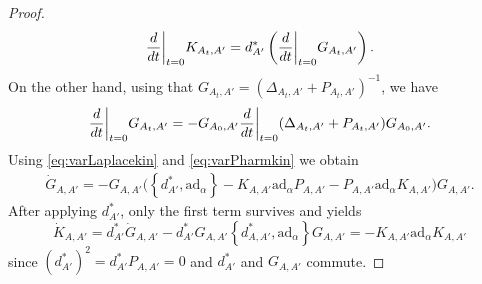 \documentclass[11pt,a4paper]{amsart}
\theoremstyle{plain} %
\theoremstyle{definition}
\theoremstyle{remark}
\newcommand{\dd}{d}
\newcommand\restr[2]{{%
  \left.\kern-\nulldelimiterspace %
  #1 %
  \vphantom{\big|} %
  \right|_{#2} %
  }}
\begin{document}
\begin{proof}
$$\restr{\frac{d}{dt}}{t=0}{K}_{A_t,A'} =  \dd^*_{A'}   \left(\restr{\frac{d}{dt}}{t=0}{G_{A_t,A'}}\right).$$
 On the other hand, using that $G_{A_t,A'} = (\Delta_{A_t,A'} + P_{A_t,A'})^{-1}$, we have 
$$\restr{\frac{d}{dt}}{t=0}G_{A_t,A'} = - G_{A_0,A'}   \restr{\frac{d}{dt}}{{t=0}}(\Delta_{A_t,A'} + P_{A_t,A'})   G_{A_0,A'}.$$
Using \eqref{eq:varLaplacekin} and \eqref{eq:varPharmkin} we obtain 
\begin{multline}\label{variation of G wrt A_0}
\dot{G}_{A,A'} = - G_{A,A'}\big( \left\lbrace \dd^*_{A'},\mathrm{ad}_\alpha\right\rbrace  
- K_{A,A'} \mathrm{ad}_\alpha  P_{A,A'} - P_{A ,A'}  \mathrm{ad}_\alpha    K_{A,A'} \big)G_{A,A'}.
\end{multline}
After applying $\dd^*_{A'}$, only the first term survives and yields  
$$\dot{K}_{A,A'} = \dd^*_{A'}\dot{G}_{A,A'}-\dd^*_{A'}G_{A,A'} \left\lbrace \dd^*_{A,A'},\mathrm{ad}_\alpha\right\rbrace G_{A,A'} = - K_{A,A'}\mathrm{ad}_\alpha K_{A,A'}$$
since $\left(\dd^*_{A'}\right)^2 = d^*_{A'}P_{A,A'} = 0$ and $\dd^*_{A'}$ and $G_{A,A'}$ commute. 
\end{proof}
\end{document}
